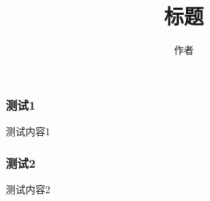 \documentclass{ctexbeamer}
\begin{document}
    \title{标题}
    \author{作者}
    \maketitle

    

    \begin{frame}
        \frametitle{测试1}
    
        测试内容1
    
    \end{frame}

    

    \begin{frame}
        \frametitle{测试2}
    
        测试内容2
    
    \end{frame}
\end{document}
